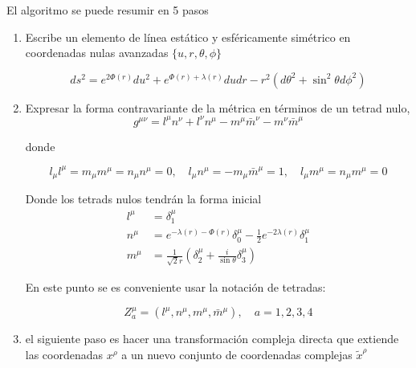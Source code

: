 El algoritmo se puede resumir en 5 pasos
\begin{enumerate}[1]
    \item Escribe un elemento de línea estático y esféricamente simétrico en coordenadas nulas avanzadas $\{u, r, \theta, \phi\}$

          \begin{equation}
              d s^2=e^{2 \Phi(r)} d u^2+e^{\Phi(r)+\lambda(r)} d u d r-r^2\left(d \theta^2+\sin ^2 \theta d \phi^2\right)
          \end{equation}

    \item Expresar la forma contravariante de la métrica en términos de un tetrad nulo,
          \begin{equation}
              g^{\mu \nu}=l^\mu n^\nu+l^\nu n^\mu-m^\mu \bar{m}^\nu-m^\nu \bar{m}^\mu
          \end{equation}

          donde

          \begin{equation}
              l_\mu l^\mu=m_\mu m^\mu=n_\mu n^\mu=0, \quad l_\mu n^\mu=-m_\mu \bar{m}^\mu=1, \quad l_\mu m^\mu=n_\mu m^\mu=0
          \end{equation}


          Donde los tetrads nulos tendrán la forma inicial
          \begin{equation}
              \begin{aligned}
                  l^\mu & =\delta_1^\mu                                                                     \\
                  n^\mu & =e^{-\lambda(r)-\Phi(r)} \delta_0^\mu-\frac{1}{2} e^{-2 \lambda(r)} \delta_1^\mu  \\
                  m^\mu & =\frac{1}{\sqrt{2} r}\left(\delta_2^\mu+\frac{i}{\sin \theta} \delta_3^\mu\right)
              \end{aligned}
          \end{equation}

          En este punto se es conveniente usar la notación de tetradas:

          \begin{equation}
              Z_a^\mu=\left(l^\mu, n^\mu, m^\mu, \bar{m}^\mu\right), \quad a=1,2,3,4
          \end{equation}

    \item el siguiente paso es hacer una  transformación compleja directa que extiende las coordenadas $x^\rho$ a un nuevo conjunto de coordenadas complejas $\tilde{x}^\rho$


\end{enumerate}
